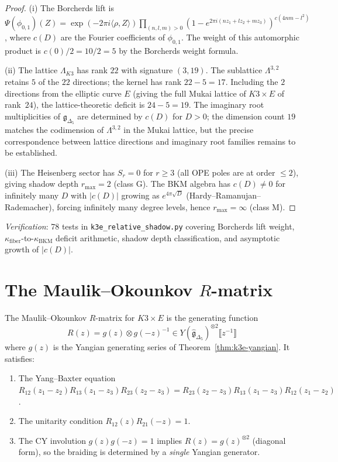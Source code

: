 \begin{proof}
(i) The Borcherds lift is $\Psi(\phi_{0,1})(Z) = \exp(-2\pi i \langle \rho, Z \rangle) \prod_{(n,l,m) > 0}(1 - e^{2\pi i(nz_1 + lz_2 + mz_3)})^{c(4nm - l^2)}$, where $c(D)$ are the Fourier coefficients of $\phi_{0,1}$. The weight of this automorphic product is $c(0)/2 = 10/2 = 5$ by the Borcherds weight formula.

(ii) The lattice $\Lambda_{K3}$ has rank $22$ with signature $(3,19)$. The sublattice $\Lambda^{3,2}$ retains $5$ of the $22$ directions; the kernel has rank $22 - 5 = 17$. Including the $2$ directions from the elliptic curve $E$ (giving the full Mukai lattice of $K3 \times E$ of rank~$24$), the lattice-theoretic deficit is $24 - 5 = 19$. The imaginary root multiplicities of $\mathfrak{g}_{\Delta_5}$ are determined by $c(D)$ for $D > 0$; the dimension count $19$ matches the codimension of $\Lambda^{3,2}$ in the Mukai lattice, but the precise correspondence between lattice directions and imaginary root families remains to be established.

(iii) The Heisenberg sector has $S_r = 0$ for $r \geq 3$ (all OPE poles are at order $\leq 2$), giving shadow depth $r_{\max} = 2$ (class G). The BKM algebra has $c(D) \neq 0$ for infinitely many $D$ with $|c(D)|$ growing as $e^{4\pi\sqrt{D}}$ (Hardy--Ramanujan--Rademacher), forcing infinitely many degree levels, hence $r_{\max} = \infty$ (class M).
\end{proof}

\noindent\textit{Verification}: 78 tests in \texttt{k3e\_relative\_shadow.py} covering Borcherds lift weight, $\kappa_{\mathrm{fiber}}$-to-$\kappa_{\mathrm{BKM}}$ deficit arithmetic, shadow depth classification, and asymptotic growth of $|c(D)|$.

\section{The Maulik--Okounkov $R$-matrix}
\label{sec:k3e-mo-rmatrix}

\begin{theorem}
\label{thm:k3e-mo-rmatrix}
\ClaimStatusProvedElsewhere
The Maulik--Okounkov $R$-matrix for $K3 \times E$ is the generating function
\[
 R(z) = g(z) \otimes g(-z)^{-1} \in Y(\widehat{\mathfrak{g}}_{\Delta_5})^{\otimes 2}\llbracket z^{-1} \rrbracket
\]
where $g(z)$ is the Yangian generating series of Theorem~\ref{thm:k3e-yangian}. It satisfies:
\begin{enumerate}[label=(\roman*)]
 \item The Yang--Baxter equation $R_{12}(z_1 - z_2) R_{13}(z_1 - z_3) R_{23}(z_2 - z_3) = R_{23}(z_2 - z_3) R_{13}(z_1 - z_3) R_{12}(z_1 - z_2)$.
 \item The unitarity condition $R_{12}(z) R_{21}(-z) = 1$.
 \item The CY involution $g(z) g(-z) = 1$ implies $R(z) = g(z)^{\otimes 2}$ (diagonal form), so the braiding is determined by a \emph{single} Yangian generator.
\end{enumerate}
\ClaimStatusProvedElsewhere
\end{theorem}

